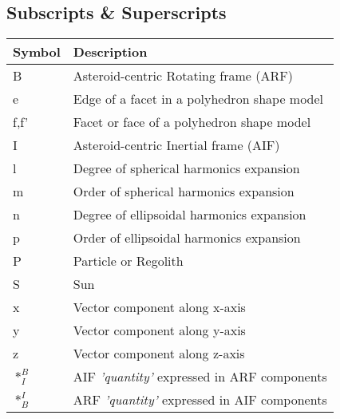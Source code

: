 \subsection*{Subscripts \& Superscripts}
\begin{longtable}[l]{p{100pt} p{230pt}}
    \textbf{Symbol} & \textbf{Description}                                              \\
    \hline
    B                                 & Asteroid-centric Rotating frame (ARF)           \\
    e                                 & Edge of a facet in a polyhedron shape model     \\
    f,f'                              & Facet or face of a polyhedron shape model       \\
    I                                 & Asteroid-centric Inertial frame (AIF)           \\
    l                                 & Degree of spherical harmonics expansion         \\
    m                                 & Order of spherical harmonics expansion          \\
    n                                 & Degree of ellipsoidal harmonics expansion       \\
    p                                 & Order of ellipsoidal harmonics expansion        \\
    P                                 & Particle or Regolith                            \\
    S                                 & Sun                                             \\
    x                                 & Vector component along x-axis                   \\
    y                                 & Vector component along y-axis                   \\
    z                                 & Vector component along z-axis                   \\
    $\ast_{I}^{B}$                    & AIF \textit{'quantity'} expressed
                                        in ARF components                               \\
    $\ast_{B}^{I}$                    & ARF \textit{'quantity'} expressed
                                        in AIF components                               \\
\end{longtable}
